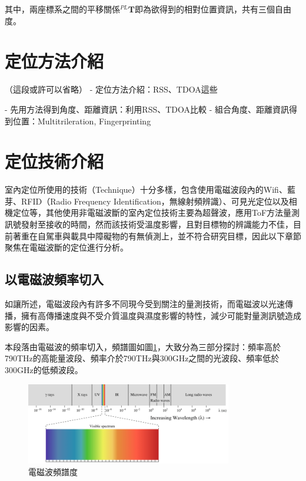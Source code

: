     
    
   其中，兩座標系之間的平移關係$^{PL}\boldsymbol{T}$即為欲得到的相對位置資訊，共有三個自由度。

 



\section{定位方法介紹}
（這段或許可以省略）
    - 定位方法介紹：RSS、TDOA這些
    
    
    - 先用方法得到角度、距離資訊：利用RSS、TDOA比較
    - 組合角度、距離資訊得到位置：Multitrileration, Fingerprinting

\section{定位技術介紹}

    室內定位所使用的技術（Technique）十分多樣，包含使用電磁波段內的Wifi、藍芽、RFID（Radio Frequency Identification，無線射頻辨識）、可見光定位以及相機定位等，其他使用非電磁波斷的室內定位技術主要為超聲波，應用ToF方法量測訊號發射至接收的時間，然而該技術受溫度影響，且對目標物的辨識能力不佳，目前著重在自駕車與載具中障礙物的有無偵測上\cite{survey_ultrasonic}，並不符合研究目標，因此以下章節聚焦在電磁波斷的定位進行分析。

    \subsection{以電磁波頻率切入}

        如讓所述，電磁波段內有許多不同現今受到關注的量測技術，而電磁波以光速傳播，擁有高傳播速度與不受介質溫度與濕度影響的特性，減少可能對量測訊號造成影響的因素。

        本段落由電磁波的頻率切入，頻譜圖如圖\ref{pic:spectrum}，大致分為三部分探討：頻率高於790THz的高能量波段、頻率介於790THz與300GHz之間的光波段、頻率低於300GHz的低頻波段\cite{book_electromagnetic}。

        \begin{figure}[ht]
            \centering
            \includegraphics[width=9cm]{ch2pic/electro_spectrum.png}
            \caption{電磁波頻譜度\cite{Spectrum}}
            \label{pic:spectrum}
        \end{figure}
        
